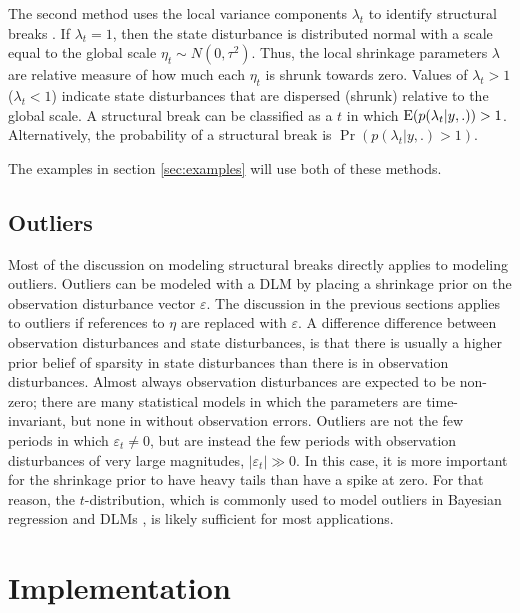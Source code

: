\documentclass{article}
\begin{document}
The second method uses the local variance components $\lambda_{t}$ to identify structural breaks \parencite[179-180]{PetrisPetroneEtAl2009}.
If $\lambda_{t} = 1$, then the state disturbance is distributed normal with a scale equal to the global scale $\eta_{t} \sim N(0, \tau^{2})$.
Thus, the local shrinkage parameters $\lambda$ are relative measure of how much each $\eta_{t}$ is shrunk towards zero.
Values of $\lambda_{t} > 1$ ($\lambda_{t} < 1$) indicate state disturbances that are dispersed (shrunk) relative to the global scale.
A structural break can be classified as a $t$ in which $\operatorname{E} (p(\lambda_{t} | y, .)) > 1$.
Alternatively, the probability of a structural break is $\Pr(p(\lambda_{t} | y, .) > 1)$.

The examples in section \ref{sec:examples} will use both of these methods.

\subsection{Outliers}
\label{sec:outliers}

Most of the discussion on modeling structural breaks directly applies to modeling outliers.
Outliers can be modeled with a DLM by placing a shrinkage prior on the observation disturbance vector $\varepsilon$. 
The discussion in the previous sections applies to outliers if references to $\eta$ are replaced with $\varepsilon$.
A difference difference between observation disturbances and state disturbances, is that there is usually a higher prior belief of sparsity in state disturbances than there is in observation disturbances.
Almost always observation disturbances are expected to be non-zero;
there are many statistical models in which the parameters are time-invariant, but none in without observation errors.%
Outliers are not the few periods in which $\varepsilon_{t} \neq 0$, but are instead the few periods with observation disturbances of very large magnitudes, $|\varepsilon_{t}| \gg 0$.
In this case, it is more important for the shrinkage prior to have heavy tails than have a spike at zero. 
For that reason, the $t$-distribution, which is commonly used to model outliers in Bayesian regression and DLMs \parencite{West1984}, is likely sufficient for most applications.

\section{Implementation}
\label{sec:implementation}
\end{document}
